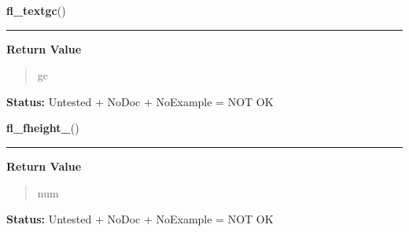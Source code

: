     \label{xformslib:library:fl_textgc_}

    \vspace{0.5ex}

\hspace{.8\funcindent}\begin{boxedminipage}{\funcwidth}

    \raggedright \textbf{fl\_textgc}()

    \vspace{-1.5ex}

    \rule{\textwidth}{0.5\fboxrule}
\setlength{\parskip}{2ex}
\setlength{\parskip}{1ex}
      \textbf{Return Value}
    \vspace{-1ex}

      \begin{quote}
      gc

      \end{quote}

\textbf{Status:} Untested + NoDoc + NoExample = NOT OK



    \end{boxedminipage}

    \label{xformslib:library:fl_fheight_}

    \vspace{0.5ex}

\hspace{.8\funcindent}\begin{boxedminipage}{\funcwidth}

    \raggedright \textbf{fl\_fheight\_}()

    \vspace{-1.5ex}

    \rule{\textwidth}{0.5\fboxrule}
\setlength{\parskip}{2ex}
\setlength{\parskip}{1ex}
      \textbf{Return Value}
    \vspace{-1ex}

      \begin{quote}
      num

      \end{quote}

\textbf{Status:} Untested + NoDoc + NoExample = NOT OK



    \end{boxedminipage}

